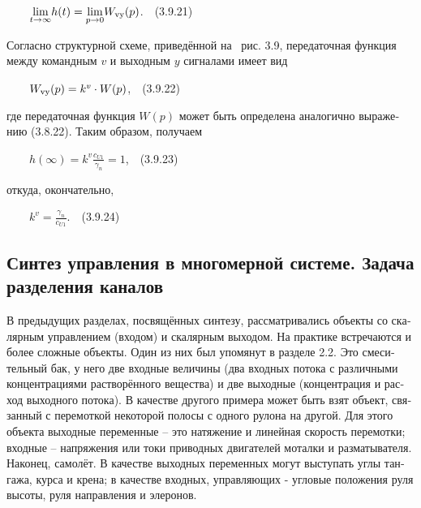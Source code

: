 \documentclass[a4paper]{article}
\newcommand\normalsubformula[1]{\text{\mathversion{normal}$#1$}}
\begin{document}
{\begin{russian}\sffamily
\ \ \ \  $\underset{t\rightarrow \infty }{\text{lim}}h(t)=\underset{p\rightarrow
0}{\text{lim}}W_{\normalsubformula{\text{vy}}}(p)$.\ \ (3.9.21)
\end{russian}}

{\begin{russian}\sffamily
Согласно структурной схеме, приведённой на \ рис. 3.9, передаточная функция между командным  $v$ и выходным  $y$
сигналами имеет вид
\end{russian}}

{\begin{russian}\sffamily
\ \  \ \  $W_{\normalsubformula{\text{vy}}}(p)=k^v\cdot W(p)$,\ \ (3.9.22)
\end{russian}}

{\begin{russian}\sffamily
где передаточная функция  $W(p)$ может быть определена аналогично выражению (3.8.22). Таким образом, получаем
\end{russian}}

{\begin{russian}\sffamily
\ \ \ \  $h\left(\infty \right)=k^v\frac{c_{\mathit{U1}}}{γ_n}=1$,\ \ (3.9.23)
\end{russian}}

{\begin{russian}\sffamily
откуда, окончательно,
\end{russian}}

{\begin{russian}\sffamily
\ \ \ \  $k^v=\frac{γ_n}{c_{\mathit{U1}}}$.\ \ (3.9.24)
\end{russian}}

\clearpage\subsection{Синтез управления в многомерной системе. Задача разделения каналов}
\hypertarget{RefHeadingToc455659744}{}
\bigskip

{\begin{russian}\sffamily
В предыдущих разделах, посвящённых синтезу, рассматривались объекты со скалярным управлением (входом) и скалярным
выходом. На практике встречаются и более сложные объекты. Один из них был упомянут в разделе 2.2. Это смесительный бак,
у него две входные величины (два входных потока с различными концентрациями растворённого вещества) и две выходные
(концентрация и расход выходного потока). В качестве другого примера может быть взят объект, связанный с перемоткой
некоторой полосы с одного рулона на другой. Для этого объекта выходные переменные – это натяжение и линейная скорость
перемотки; входные – напряжения или токи приводных двигателей моталки и разматывателя. Наконец, самолёт. В качестве
выходных переменных могут выступать углы тангажа, курса и крена; в качестве входных, управляющих - угловые положения
руля высоты, руля направления и элеронов.
\end{russian}}
\end{document}
